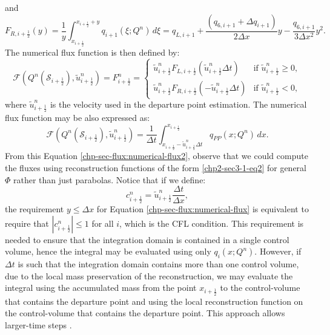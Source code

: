 and
\begin{equation}
	\label{chp-sec-flux:fR_2}
	F_{R,i+\frac{1}{2}}(y) = \frac{1}{y} \int_{x_{i+\frac{1}{2}}}^{x_{i+\frac{1}{2}}+y}
	q_{i+1}(\xi;Q^n)\,d\xi = 
	q_{L,i+1} +\frac{(q_{6,i+1} + \Delta q_{i+1})}{2\Delta x}y
	- \frac{q_{6,i+1}}{3\Delta x^2}y^2.
\end{equation}
The numerical flux function is then defined by:
\begin{equation}
	\label{chp-sec-flux:numerical-flux}
	\mathcal{F}(Q^n(\mathcal{S}_{i+\frac{1}{2}}),\tilde{u}_{i+\frac{1}{2}}^n) = F_{i+\frac{1}{2}}^n =  
    	\begin{cases}
		\tilde{u}_{i+\frac{1}{2}}^nF_{L,i+\frac{1}{2}}( \tilde{u}_{i+\frac{1}{2}}^n\Delta t) & \text{if } \tilde{u}_{i+\frac{1}{2}}^n \geq 0,\\
		\tilde{u}_{i+\frac{1}{2}}^nF_{R,i+\frac{1}{2}}(-\tilde{u}_{i+\frac{1}{2}}^n\Delta t) & \text{if } \tilde{u}_{i+\frac{1}{2}}^n<0,
    	\end{cases}
\end{equation}
where $\tilde{u}_{i+\frac{1}{2}}^n$ is the velocity used in the departure point estimation.
The numerical flux function may be also expressed as:
\begin{equation}
	\label{chp-sec-flux:numerical-flux2}
	\mathcal{F}(Q^n(\mathcal{S}_{i+\frac{1}{2}}),\tilde{u}_{i+\frac{1}{2}}^n) =  \frac{1}{\Delta t} 
	\int_{x_{i+\frac{1}{2}}-\tilde{u}^n_{i+\frac{1}{2}}\Delta t}^{x_{i+\frac{1}{2}}}
	q_{PP}(x;Q^n) \,dx.
\end{equation}
From this Equation \eqref{chp-sec-flux:numerical-flux2}, observe that we could compute the fluxes using reconstruction functions of the form \eqref{chp2-sec3-1-eq2}
for general $\Phi$ rather than just parabolas.
Notice that if we define:
\begin{equation*}
	\label{chp-sec-flux:cedges}
	c_{i+\frac{1}{2}}^n = \tilde{u}_{i+\frac{1}{2}}^n\frac{\Delta t}{\Delta x},
\end{equation*}
the requirement $y\leq \Delta x$ for 
Equation \eqref{chp-sec-flux:numerical-flux} is equivalent
to require that $|c^{n}_{i+\frac{1}{2}}| \leq 1$ for all $i$,  which is the CFL condition.
This requirement is needed to ensure that the integration domain is contained in a single control volume, hence
the integral may be evaluated using only $q_i(x;Q^n)$. However, if $\Delta t$ is such that the integration domain
contains more than one control volume, due to the local mass preservation of the reconstruction, we may evaluate the integral
using the accumulated mass from the point $x_{i+\frac{1}{2}}$ to the control-volume that contains the departure point and using
the local reconstruction function on the control-volume that contains the departure point.
This approach allows larger-time steps \citep{chen:2017}.

